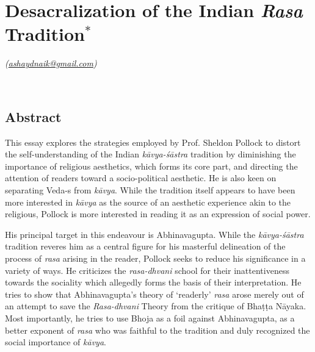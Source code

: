 \chapter[Desacralization of the Indian \textsl{Rasa} Tradition]{Desacralization of the Indian \textsl{Rasa} Tradition$^{*}$}\label{chapter\thechapter:begin}

\hfill{\sl(\url{ashaydnaik@gmail.com})}


~

\vskip 10pt

\section*{Abstract}

This essay explores the strategies employed by Prof. Sheldon Pollock to distort the self-understanding of the Indian \textsl{kāvya-śāstra} tradition by diminishing the importance of religious aesthetics, which forms its core part, and directing the attention of readers toward a socio-political aesthetic. He is also keen on separating Veda-s from \textsl{kāvya}. While the tradition itself appears to have been more interested in \textsl{kāvya} as the source of an aesthetic experience akin to the religious, Pollock is more interested in reading it as an expression of social power. 

His principal target in this endeavour is Abhinavagupta. While the \textsl{kāvya-śāstra} tradition reveres him as a central figure for his masterful delineation of the process of \textsl{rasa} arising in the reader, Pollock seeks to reduce his significance in a variety of ways. He criticizes the \textsl{rasa-dhvani} school for their inattentiveness towards the sociality which allegedly forms the basis of their interpretation. He tries to show that Abhinavagupta's theory of `readerly' \textsl{rasa} arose merely out of an attempt to save the \textsl{Rasa-dhvani} Theory from the critique of Bhaṭṭa Nāyaka. Most importantly, he tries to use Bhoja as a foil against Abhinavagupta, as a better exponent of \textsl{rasa} who was faithful to the tradition and duly recognized the social importance of \textsl{kāvya}. 

